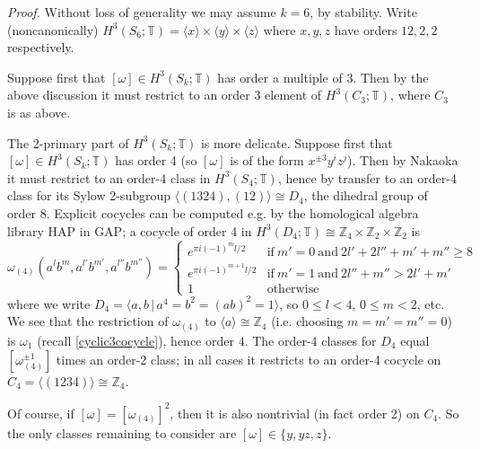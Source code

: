 \documentclass[12pt]{article}
\numberwithin{equation}{section}
\def\bbT           {\mathbb{T}}
\def\bbZ           {\mathbb{Z}}
\begin{document}
\noindent\textit{Proof.} Without loss of generality we may assume $k=6$, by stability. Write (noncanonically) $H^3(S_6;\bbT)=\langle x\rangle\times\langle y\rangle\times\langle z\rangle$ where $x,y,z$ have orders $12,2,2$ respectively.

 Suppose first that $[\omega]\in
H^3(S_k;\bbT)$ has order a multiple of 3. Then by the above discussion  it must restrict to an order 3 element of $H^3(C_3;\bbT)$, where $C_3$ is as above.



The 2-primary part of $H^3(S_k;\bbT)$ is more delicate.  Suppose first that $[\omega]\in
H^3(S_k;\bbT)$ has order  4 (so $[\omega]$ is of the form $x^{\pm 3}y^iz^j$). Then by Nakaoka it must restrict to an order-4 class in  $H^3(S_4;\bbT)$, hence by transfer to an order-4 class for its Sylow 2-subgroup $\langle (1324),(12)\rangle\cong D_4$, the dihedral group of order 8. Explicit cocycles can be computed e.g. by the homological algebra library HAP in GAP; a cocycle of order 4 in $H^3(D_4;\bbT)\cong\bbZ_4\times\bbZ_2
\times \bbZ_2$ is
$$\omega_{(4)}(a^lb^m,a^{l'}b^{m'},a^{l''}b^{m''})=\left\{\begin{matrix}e^{\pi i(-1)^ml/2}&\mathrm{if}\ m'=0\ \mathrm{and}\ 2l'+2l''+m'+m''\ge 8\\ e^{\pi i(-1)^{m+1}l/2}&\mathrm{if}\ m'=1\ \mathrm{and}\ 2l''+m''>2l'+m'\\ 1&\mathrm{otherwise}\end{matrix}\right.$$
where we write $D_4=\langle a,b\,|\,a^4=b^2=(ab)^2=1\rangle$, so $0\le l<4$, $0\le m<2$, etc. We see  that the restriction of $\omega_{(4)}$ to $\langle a\rangle\cong \bbZ_4$ (i.e. choosing $m=m'=m''=0$) is $\omega_1$ (recall \eqref{cyclic3cocycle}), hence order 4. The order-4 classes for $D_4$ equal $[\omega_{(4)}^{\pm 1}]$  times an order-2 class; in all cases it restricts to
an order-4 cocycle on  $C_4=
\langle (1234)\rangle\cong \bbZ_4$.

Of course, if $[\omega]=[\omega_{(4)}]^2$, then it is also nontrivial (in fact order 2) on $C_4$. So the only classes remaining to consider are $[\omega]\in\{y,yz,z\}$.
\end{document}
